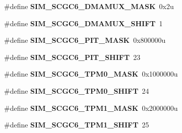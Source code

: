 \begin{DoxyCompactItemize}
\item 
\hypertarget{group___s_i_m___register___masks_ga10469a89e2c48cd79e29fb73b0d06395}{}\#define {\bfseries S\+I\+M\+\_\+\+S\+C\+G\+C6\+\_\+\+D\+M\+A\+M\+U\+X\+\_\+\+M\+A\+S\+K}~0x2u\label{group___s_i_m___register___masks_ga10469a89e2c48cd79e29fb73b0d06395}

\item 
\hypertarget{group___s_i_m___register___masks_gaa69ac431213fb94ecd1d9ed2fa966e50}{}\#define {\bfseries S\+I\+M\+\_\+\+S\+C\+G\+C6\+\_\+\+D\+M\+A\+M\+U\+X\+\_\+\+S\+H\+I\+F\+T}~1\label{group___s_i_m___register___masks_gaa69ac431213fb94ecd1d9ed2fa966e50}

\item 
\hypertarget{group___s_i_m___register___masks_gaf5baabd241aba695593ce6369aa56ee2}{}\#define {\bfseries S\+I\+M\+\_\+\+S\+C\+G\+C6\+\_\+\+P\+I\+T\+\_\+\+M\+A\+S\+K}~0x800000u\label{group___s_i_m___register___masks_gaf5baabd241aba695593ce6369aa56ee2}

\item 
\hypertarget{group___s_i_m___register___masks_ga2600ceb860eb353aa61abbecdbf5b6ae}{}\#define {\bfseries S\+I\+M\+\_\+\+S\+C\+G\+C6\+\_\+\+P\+I\+T\+\_\+\+S\+H\+I\+F\+T}~23\label{group___s_i_m___register___masks_ga2600ceb860eb353aa61abbecdbf5b6ae}

\item 
\hypertarget{group___s_i_m___register___masks_gad879476f2922fd7dad2f65d3d052e95d}{}\#define {\bfseries S\+I\+M\+\_\+\+S\+C\+G\+C6\+\_\+\+T\+P\+M0\+\_\+\+M\+A\+S\+K}~0x1000000u\label{group___s_i_m___register___masks_gad879476f2922fd7dad2f65d3d052e95d}

\item 
\hypertarget{group___s_i_m___register___masks_ga9e379c439a6d1d14f65b4c58c46453c5}{}\#define {\bfseries S\+I\+M\+\_\+\+S\+C\+G\+C6\+\_\+\+T\+P\+M0\+\_\+\+S\+H\+I\+F\+T}~24\label{group___s_i_m___register___masks_ga9e379c439a6d1d14f65b4c58c46453c5}

\item 
\hypertarget{group___s_i_m___register___masks_ga94a77c9065fd06f267b9920024067cd6}{}\#define {\bfseries S\+I\+M\+\_\+\+S\+C\+G\+C6\+\_\+\+T\+P\+M1\+\_\+\+M\+A\+S\+K}~0x2000000u\label{group___s_i_m___register___masks_ga94a77c9065fd06f267b9920024067cd6}

\item 
\hypertarget{group___s_i_m___register___masks_ga26bf0c38385affd6680bb0f4853e43df}{}\#define {\bfseries S\+I\+M\+\_\+\+S\+C\+G\+C6\+\_\+\+T\+P\+M1\+\_\+\+S\+H\+I\+F\+T}~25\label{group___s_i_m___register___masks_ga26bf0c38385affd6680bb0f4853e43df}


\end{DoxyCompactItemize}
